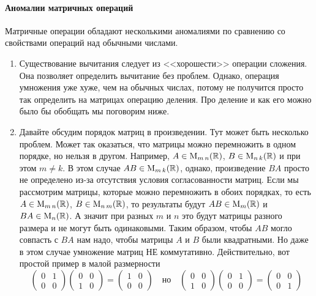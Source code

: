 \paragraph{Аномалии матричных операций}

Матричные операции обладают несколькими аномалиями по сравнению со свойствами операций над обычными числами.
\begin{enumerate}
\item Существование вычитания следует из <<хорошести>> операции сложения.
Она позволяет определить вычитание без проблем.
Однако, операция умножения уже хуже, чем на обычных числах, потому не получится просто так определить на матрицах операцию деления.
Про деление и как его можно было бы обобщать мы поговорим ниже.

\item Давайте обсудим порядок матриц в произведении.
Тут может быть несколько проблем.
Может так оказаться, что матрицы можно перемножить в одном порядке, но нельзя в другом.
Например, $A\in \operatorname{M}_{m\,n}(\mathbb R)$, $B\in \operatorname{M}_{n\,k}(\mathbb R)$ и при этом $m\neq k$.
В этом случае $AB\in \operatorname{M}_{m\,k}(\mathbb R)$, однако, произведение $BA$ просто не определено из-за отсутствия условия согласованности матриц.
Если мы рассмотрим матрицы, которые можно перемножить в обоих порядках, то есть $A\in \operatorname{M}_{m\,n}(\mathbb R)$, $B\in \operatorname{M}_{n\,m}(\mathbb R)$, то результаты будут $AB\in \operatorname{M}_{m}(\mathbb R)$ и $BA\in \operatorname{M}_{n}(\mathbb R)$.
А значит при разных $m$ и $n$ это будут матрицы разного размера и не могут быть одинаковыми.
Таким образом, чтобы $AB$ могло совпасть с $BA$ нам надо, чтобы матрицы $A$ и $B$ были квадратными.
Но даже в этом случае умножение матриц НЕ коммутативно.
Действительно, вот простой пример в малой размерности
\[
\begin{pmatrix}
{0}&{1}\\
{0}&{0}
\end{pmatrix}
\begin{pmatrix}
{0}&{0}\\
{1}&{0}
\end{pmatrix}
=
\begin{pmatrix}
{1}&{0}\\
{0}&{0}
\end{pmatrix}\quad\text{но}\quad
\begin{pmatrix}
{0}&{0}\\
{1}&{0}
\end{pmatrix}
\begin{pmatrix}
{0}&{1}\\
{0}&{0}
\end{pmatrix}
=\begin{pmatrix}
{0}&{0}\\
{0}&{1}
\end{pmatrix}
\]


\end{enumerate}
